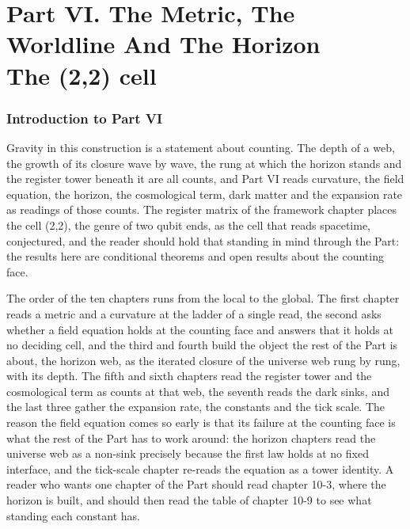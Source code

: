 \clearpage
\part*{Part VI. The Metric, The Worldline And The Horizon\\[5pt]{\large The (2,2) cell}}
\label{atlaspart:06-cell-2-2-metric-and-horizon}
\section*{Introduction to Part VI}\label{narr:part:X}
Gravity in this construction is a statement about counting. The depth of a web, the growth of its closure wave by wave, the rung at which the horizon stands and the register tower beneath it are all counts, and Part VI reads curvature, the field equation, the horizon, the cosmological term, dark matter and the expansion rate as readings of those counts. The register matrix of the framework chapter places the cell (2,2), the genre of two qubit ends, as the cell that reads spacetime, conjectured, and the reader should hold that standing in mind through the Part: the results here are conditional theorems and open results about the counting face.

The order of the ten chapters runs from the local to the global. The first chapter reads a metric and a curvature at the ladder of a single read, the second asks whether a field equation holds at the counting face and answers that it holds at no deciding cell, and the third and fourth build the object the rest of the Part is about, the horizon web, as the iterated closure of the universe web rung by rung, with its depth. The fifth and sixth chapters read the register tower and the cosmological term as counts at that web, the seventh reads the dark sinks, and the last three gather the expansion rate, the constants and the tick scale. The reason the field equation comes so early is that its failure at the counting face is what the rest of the Part has to work around: the horizon chapters read the universe web as a non-sink precisely because the first law holds at no fixed interface, and the tick-scale chapter re-reads the equation as a tower identity. A reader who wants one chapter of the Part should read chapter 10-3, where the horizon is built, and should then read the table of chapter 10-9 to see what standing each constant has.


